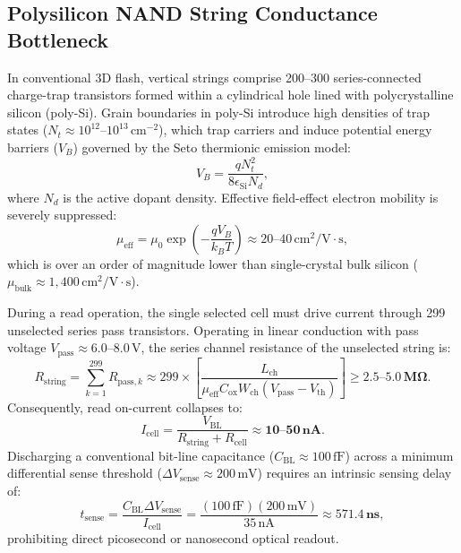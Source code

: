 \documentclass[journal]{IEEEtran}
\begin{document}
\subsection{Polysilicon NAND String Conductance Bottleneck}
In conventional 3D flash, vertical strings comprise 200--300 series-connected charge-trap transistors formed within a cylindrical hole lined with polycrystalline silicon (poly-Si). Grain boundaries in poly-Si introduce high densities of trap states ($N_t \approx 10^{12}\text{--}10^{13}\,\text{cm}^{-2}$), which trap carriers and induce potential energy barriers ($V_B$) governed by the Seto thermionic emission model:
\begin{equation}
    V_B = \frac{q N_t^2}{8 \epsilon_{\text{Si}} N_d},
\end{equation}
where $N_d$ is the active dopant density. Effective field-effect electron mobility is severely suppressed:
\begin{equation}
    \mu_{\text{eff}} = \mu_0 \exp\left(-\frac{q V_B}{k_B T}\right) \approx 20\text{--}40\,\text{cm}^2/\text{V}\cdot\text{s},
\end{equation}
which is over an order of magnitude lower than single-crystal bulk silicon ($\mu_{\text{bulk}} \approx 1,400\,\text{cm}^2/\text{V}\cdot\text{s}$).

During a read operation, the single selected cell must drive current through 299 unselected series pass transistors. Operating in linear conduction with pass voltage $V_{\text{pass}} \approx 6.0\text{--}8.0\,\text{V}$, the series channel resistance of the unselected string is:
\begin{equation}
    R_{\text{string}} = \sum_{k=1}^{299} R_{\text{pass}, k} \approx 299 \times \left[ \frac{L_{\text{ch}}}{\mu_{\text{eff}} C_{\text{ox}} W_{\text{ch}} (V_{\text{pass}} - V_{\text{th}})} \right] \ge \mathbf{2.5\text{--}5.0\,\text{M}\Omega}.
\end{equation}
Consequently, read on-current collapses to:
\begin{equation}
    I_{\text{cell}} = \frac{V_{\text{BL}}}{R_{\text{string}} + R_{\text{cell}}} \approx \mathbf{10\text{--}50\,\text{nA}}.
\end{equation}
Discharging a conventional bit-line capacitance ($C_{\text{BL}} \approx 100\,\text{fF}$) across a minimum differential sense threshold ($\Delta V_{\text{sense}} \approx 200\,\text{mV}$) requires an intrinsic sensing delay of:
\begin{equation}
    t_{\text{sense}} = \frac{C_{\text{BL}} \Delta V_{\text{sense}}}{I_{\text{cell}}} = \frac{(100\,\text{fF})(200\,\text{mV})}{35\,\text{nA}} \approx \mathbf{571.4\,\text{ns}},
\end{equation}
prohibiting direct picosecond or nanosecond optical readout.
\end{document}
